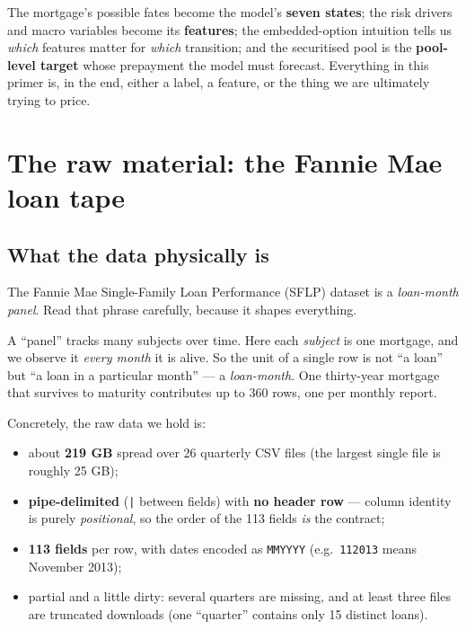 \documentclass[11pt]{article}
\begin{document}
\begin{keyidea}
The mortgage's possible fates become the model's \textbf{seven states}; the risk drivers and
macro variables become its \textbf{features}; the embedded-option intuition tells us
\emph{which} features matter for \emph{which} transition; and the securitised pool is the
\textbf{pool-level target} whose prepayment the model must forecast. Everything in this primer
is, in the end, either a label, a feature, or the thing we are ultimately trying to price.
\end{keyidea}

\section{The raw material: the Fannie Mae loan tape}
\label{sec:data}

\subsection{What the data physically is}

The Fannie Mae Single-Family Loan Performance (SFLP) dataset is a \emph{loan-month
panel}. Read that phrase carefully, because it shapes everything.

\begin{jargon}
A ``panel'' tracks many subjects over time. Here each \emph{subject} is one mortgage, and
we observe it \emph{every month} it is alive. So the unit of a single row is not ``a
loan'' but ``a loan in a particular month'' --- a \emph{loan-month}. One thirty-year
mortgage that survives to maturity contributes up to 360 rows, one per monthly report.
\end{jargon}

Concretely, the raw data we hold is:

\begin{itemize}[leftmargin=1.4em, itemsep=2pt]
  \item about \textbf{219 GB} spread over 26 quarterly CSV files (the largest single file
        is roughly 25 GB);
  \item \textbf{pipe-delimited} (\texttt{|} between fields) with \textbf{no header row} ---
        column identity is purely \emph{positional}, so the order of the 113 fields
        \emph{is} the contract;
  \item \textbf{113 fields} per row, with dates encoded as \texttt{MMYYYY}
        (e.g.\ \texttt{112013} means November 2013);
  \item partial and a little dirty: several quarters are missing, and at least three
        files are truncated downloads (one ``quarter'' contains only 15 distinct loans).
\end{itemize}
\end{document}
